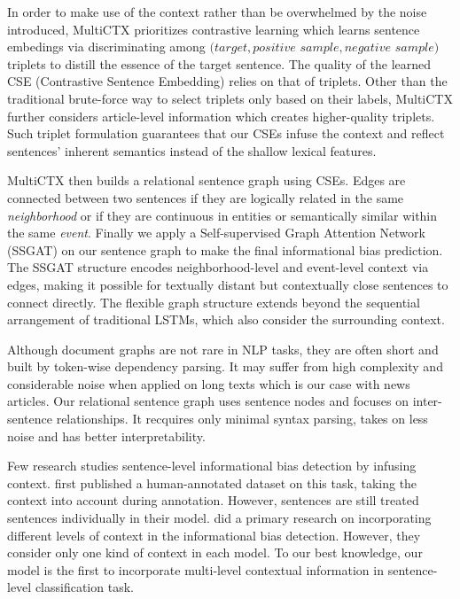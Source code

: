 In order to make use of the context rather than be overwhelmed by the noise introduced, MultiCTX prioritizes contrastive learning which learns sentence embedings via discriminating among $(target, positive$ $sample, negative$ $sample)$ triplets to distill the essence of the target sentence. The quality of the learned CSE (Contrastive Sentence Embedding) relies on that of triplets. Other than the traditional brute-force way to select triplets only based on their labels, MultiCTX further considers article-level information which creates higher-quality triplets. Such triplet formulation guarantees that our CSEs infuse the context and reflect sentences' inherent semantics instead of the shallow lexical features. 


MultiCTX then builds a relational sentence graph using CSEs. Edges are connected between two sentences if they are logically related in the same \textit{neighborhood} or if they are continuous in entities or semantically similar within the same \textit{event}. Finally we apply a Self-supervised Graph Attention Network (SSGAT) on our sentence graph to make the final informational bias prediction. The SSGAT structure encodes neighborhood-level and event-level context via edges, making it possible for textually distant but contextually close sentences to connect directly. The flexible graph structure extends beyond the sequential arrangement of traditional LSTMs, which also consider the surrounding context. 

Although document graphs are not rare in NLP tasks, they are often short and built by token-wise dependency parsing. It may suffer from high complexity and considerable noise when applied on long texts which is our case with news articles. Our relational sentence graph uses sentence nodes and focuses on inter-sentence relationships. It recquires only minimal syntax parsing, takes on less noise and has better interpretability.


Few research studies sentence-level informational bias detection by infusing context. \citet{fan-etal-2019-plain} first published a human-annotated dataset on this task, taking the context into account during annotation. However, sentences are still treated sentences individually in their model. \citet{van-den-berg-markert-2020-context} did a primary research on incorporating different levels of context in the informational bias detection. However, they consider only one kind of context in each model. To our best knowledge, our model is the first to incorporate multi-level contextual information in sentence-level classification task.

